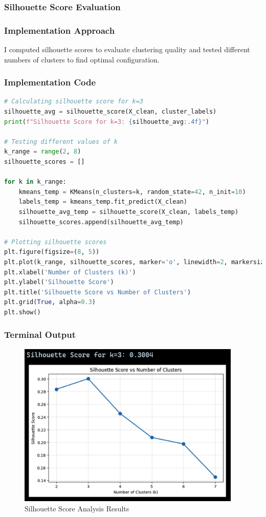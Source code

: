 \documentclass[12pt,a4paper]{article}
\begin{document}
\subsubsection{Silhouette Score Evaluation}

\subsubsection{Implementation Approach}
I computed silhouette scores to evaluate clustering quality and tested different numbers of clusters to find optimal configuration.

\subsubsection{Implementation Code}
\begin{lstlisting}[language=Python, caption=Silhouette Score Analysis]
# Calculating silhouette score for k=3
silhouette_avg = silhouette_score(X_clean, cluster_labels)
print(f"Silhouette Score for k=3: {silhouette_avg:.4f}")

# Testing different values of k
k_range = range(2, 8)
silhouette_scores = []

for k in k_range:
    kmeans_temp = KMeans(n_clusters=k, random_state=42, n_init=10)
    labels_temp = kmeans_temp.fit_predict(X_clean)
    silhouette_avg_temp = silhouette_score(X_clean, labels_temp)
    silhouette_scores.append(silhouette_avg_temp)

# Plotting silhouette scores
plt.figure(figsize=(8, 5))
plt.plot(k_range, silhouette_scores, marker='o', linewidth=2, markersize=8)
plt.xlabel('Number of Clusters (k)')
plt.ylabel('Silhouette Score')
plt.title('Silhouette Score vs Number of Clusters')
plt.grid(True, alpha=0.3)
plt.show()
\end{lstlisting}

\subsubsection{Terminal Output}
\begin{figure}[h!]
\centering
    \includegraphics[width=0.95\textwidth]{Figures/silhouette_analysis.png}
    \caption{Silhouette Score Analysis Results}
\end{figure}
\end{document}
